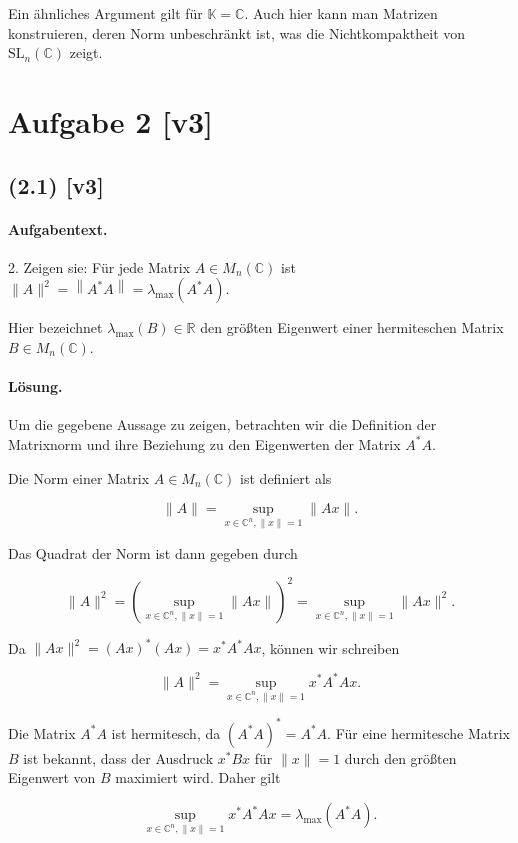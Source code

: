 \documentclass[11pt,a4paper]{article}
\begin{document}
Ein ähnliches Argument gilt für $\mathbb{K} = \mathbb{C}$. Auch hier kann man Matrizen konstruieren, deren Norm unbeschränkt ist, was die Nichtkompaktheit von $\mathrm{SL}_n(\mathbb{C})$ zeigt.


\section*{Aufgabe 2 [v3]}
\subsection*{(2.1) [v3]}
\paragraph{Aufgabentext.}
2. Zeigen sie: Für jede Matrix $A \in M_n(\mathbb{C})$ ist $\|A\|^2=\left\|A^* A\right\|=\lambda_{\max }\left(A^* A\right)$.

Hier bezeichnet $\lambda_{\max }(B) \in \mathbb{R}$ den größten Eigenwert einer hermiteschen Matrix $B \in M_n(\mathbb{C})$.

\paragraph{Lösung.}
Um die gegebene Aussage zu zeigen, betrachten wir die Definition der Matrixnorm und ihre Beziehung zu den Eigenwerten der Matrix \(A^* A\).

Die Norm einer Matrix \( A \in M_n(\mathbb{C}) \) ist definiert als

\[
\|A\| = \sup_{x \in \mathbb{C}^n, \|x\| = 1} \|Ax\|.
\]

Das Quadrat der Norm ist dann gegeben durch

\[
\|A\|^2 = \left( \sup_{x \in \mathbb{C}^n, \|x\| = 1} \|Ax\| \right)^2 = \sup_{x \in \mathbb{C}^n, \|x\| = 1} \|Ax\|^2.
\]

Da \(\|Ax\|^2 = (Ax)^* (Ax) = x^* A^* A x\), können wir schreiben

\[
\|A\|^2 = \sup_{x \in \mathbb{C}^n, \|x\| = 1} x^* A^* A x.
\]

Die Matrix \(A^* A\) ist hermitesch, da \((A^* A)^* = A^* A\). Für eine hermitesche Matrix \(B\) ist bekannt, dass der Ausdruck \(x^* B x\) für \(\|x\| = 1\) durch den größten Eigenwert von \(B\) maximiert wird. Daher gilt

\[
\sup_{x \in \mathbb{C}^n, \|x\| = 1} x^* A^* A x = \lambda_{\max}(A^* A).
\]
\end{document}
